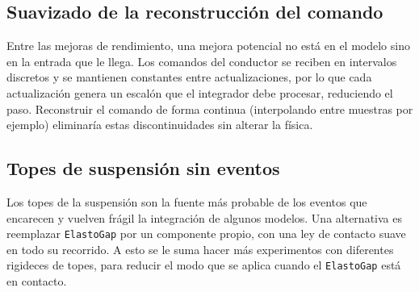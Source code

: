 
\subsection{Suavizado de la reconstrucción del comando}

Entre las mejoras de rendimiento, una mejora potencial no está en el modelo sino en la entrada que le llega. Los comandos del conductor se reciben en intervalos discretos y se mantienen constantes entre actualizaciones, por lo que cada actualización genera un escalón que el integrador debe procesar, reduciendo el paso. Reconstruir el comando de forma continua (interpolando entre muestras por ejemplo) eliminaría estas discontinuidades sin alterar la física.

\subsection{Topes de suspensión sin eventos}

Los topes de la suspensión son la fuente más probable de los eventos que encarecen y vuelven frágil la integración de algunos modelos.  Una alternativa es reemplazar \verb|ElastoGap| por un componente propio, con una ley de contacto suave en todo su recorrido. A esto se le suma hacer más experimentos con diferentes rigideces de topes, para reducir el modo que se aplica cuando el \verb|ElastoGap| está en contacto.



